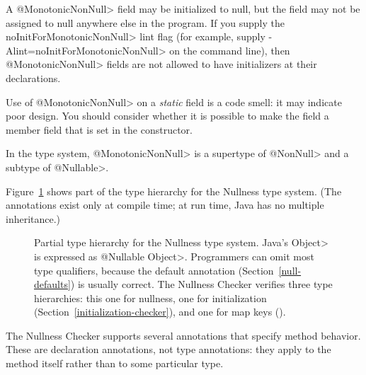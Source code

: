 \begin{description}
  A \<@MonotonicNonNull> field may be initialized to null, but the
  field may not be assigned to null anywhere else in the program.  If you
  supply the \<noInitForMonotonicNonNull> lint flag (for example, supply
  \<-Alint=noInitForMonotonicNonNull> on the command line), then
  \<@MonotonicNonNull> fields are not allowed to have initializers at their
  declarations.

  Use of \<@MonotonicNonNull> on a \emph{static} field is a code smell:  it may
  indicate poor design.  You should consider whether it is possible to make
  the field a member field that is set in the constructor.

  In the type system, \<@MonotonicNonNull> is a supertype of \<@NonNull>
  and a subtype of \<@Nullable>.

\end{description}

Figure~\ref{fig-nullness-hierarchy} shows part of the type hierarchy for the
Nullness type system.
(The annotations exist only at compile time; at run time, Java has no
multiple inheritance.)

\begin{figure}
\caption{Partial type hierarchy for the Nullness type system.
Java's \<Object> is expressed as \<@Nullable Object>.  Programmers can omit
most type qualifiers, because the default annotation
(Section~\ref{null-defaults}) is usually correct.
The Nullness Checker verifies three type hierarchies:  this one for
nullness, one for initialization (Section~\ref{initialization-checker}),
and one for map keys ().}
\label{fig-nullness-hierarchy}
\end{figure}



The Nullness Checker supports several annotations that specify method
behavior.  These are declaration annotations, not type annotations:  they
apply to the method itself rather than to some particular type.

